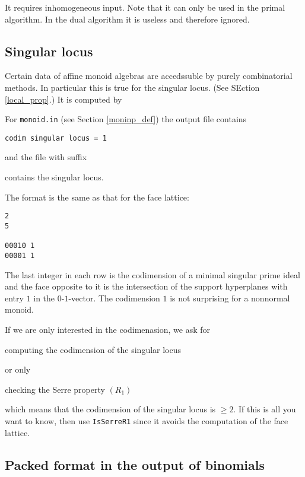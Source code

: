 It requires inhomogeneous input. Note that it can only be used in the primal algorithm. In the dual algorithm it is useless and therefore ignored.

\subsection{Singular locus}\label{SingularLocus}

Certain data of affine monoid algebras are accedssuble by purely combinatorial methods. In particular this is true for the singular locus. (See SEction \ref{local_prop}.) It is computed by
\begin{itemize}
	\itemtt[SingularLocus]
\end{itemize}
For \verb|monoid.in| (see Section \ref{moninp_def}) the output file contains
\begin{Verbatim}
codim singular locus = 1
\end{Verbatim}
and the file with suffix
\begin{itemize}
	\itemtt[sng] contains the singular locus.
\end{itemize}
The format is the same as that for the face lattice:
\begin{Verbatim}
2
5

00010 1
00001 1
\end{Verbatim}
The last integer in each row is the codimension of a minimal singular prime ideal and the face opposite to it is the intersection of the support hyperplanes with entry $1$ in the $0$-$1$-vector. The codimension $1$ is not surprising for a nonnormal monoid.

If we are only interested in the codimenasion, we ask for
\begin{itemize}
	\itemtt[CodimSingularLocus] computing the codimension of the singular locus
\end{itemize}
or only
\begin{itemize}
	\itemtt[IsSerreR1] checking the Serre property $(R_1)$
\end{itemize}
which means that the codimension of the singular locus is $\ge 2$. If this is all you want to know, then use \verb|IsSerreR1| since it avoids the computation of the face lattice.

\subsection{Packed format in the output of binomials}\label{BinomialsPacked}

